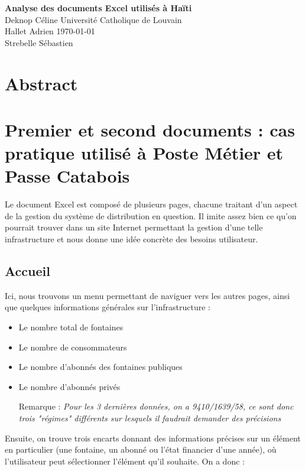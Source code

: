 \documentclass[a4paper, 11pt]{article}
\begin{document}
\noindent
\large\textbf{Analyse des documents Excel utilisés à Haïti} \\
\normalsize Deknop Céline \hfill Université Catholique de Louvain \\
Hallet Adrien \hfill \today \\
Strebelle Sébastien

\section*{Abstract}


\section{Premier et second documents : cas pratique utilisé à Poste Métier et Passe Catabois}
Le document Excel est composé de plusieurs pages, chacune traitant d'un aspect de la gestion du système de distribution en question. Il imite assez bien ce qu'on pourrait trouver dans un site Internet permettant la gestion d'une telle infrastructure et nous donne une idée concrète des besoins utilisateur.

\subsection{Accueil}
Ici, nous trouvons un menu permettant de naviguer vers les autres pages, ainsi que quelques informations générales sur l'infrastructure :

\begin{itemize}
    \item Le nombre total de fontaines
    \item Le nombre de consommateurs
    \item Le nombre d'abonnés des fontaines publiques
    \item Le nombre d'abonnés privés
    \item[Remarque] : \emph{Pour les 3 dernières données, on a 9410/1639/58, ce sont donc trois "régimes" différents sur lesquels il faudrait demander des précisions}
\end{itemize}

Ensuite, on trouve trois encarts donnant des informations précises sur un élément en particulier (une fontaine, un abonné ou l'état financier d'une année), où l'utilisateur peut sélectionner l'élément qu'il souhaite. On a donc :
\end{document}

